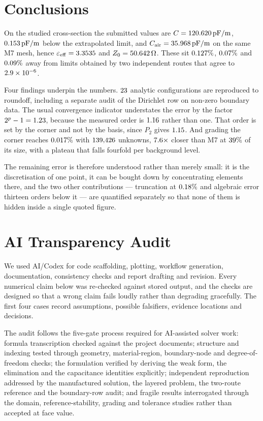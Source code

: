 \documentclass[11pt]{article}
\newcommand{\epseff}{\varepsilon_{\mathrm{eff}}}
\newcommand{\Cair}{C_{\mathrm{air}}}   %
\newcommand{\Zzero}{Z_0}
\begin{document}
\section{Conclusions}
\begin{sloppypar}
On the studied cross-section the submitted values are
$C=120.620\,\mathrm{pF/m}$, $0.153\,\mathrm{pF/m}$ below the extrapolated limit, and
$\Cair=\CAir\,\mathrm{pF/m}$ on the same M7 mesh, hence $\epseff=\EpsEff$ and $\Zzero=\ZFinal\,\Omega$. These sit
$0.127\%$, $0.07\%$ and $0.09\%$ away from limits obtained by two independent
routes that agree to $2.9\times10^{-6}$.
\end{sloppypar}

Four findings underpin the numbers. $23$ analytic configurations are reproduced to
roundoff, including a separate audit of the Dirichlet row on non-zero boundary data. The usual
convergence indicator understates the error by the factor $2^{p}-1=1.23$, because the
measured order is $1.16$ rather than one. That order is set by the corner and not by the
basis, since $P_2$ gives $1.15$. And grading the corner reaches $0.017\%$ with
$139{,}426$ unknowns, $7.6\times$ closer than M7 at $39\%$ of its size,
with a plateau that falls fourfold per background level.

The remaining error is therefore understood rather than merely small: it is the
discretisation of one point, it can be bought down by concentrating elements there, and the
two other contributions --- truncation at $0.18\%$ and algebraic error thirteen
orders below it --- are quantified separately so that none of them is hidden inside a single
quoted figure.




\appendix
\section{AI Transparency Audit}
We used AI/Codex for code scaffolding, plotting, workflow generation, documentation,
consistency checks and report drafting and revision. Every numerical claim below was
re-checked against stored output, and the checks are designed so that a wrong claim fails
loudly rather than degrading gracefully. The first four cases record assumptions, possible
falsifiers, evidence locations and decisions.

The audit follows the five-gate process required for AI-assisted solver work: formula
transcription checked against the project documents; structure and indexing tested through
geometry, material-region, boundary-node and degree-of-freedom checks; the formulation
verified by deriving the weak form, the elimination and the capacitance identities
explicitly; independent reproduction addressed by the manufactured solution, the layered
problem, the two-route reference and the boundary-row audit; and fragile results
interrogated through the domain, reference-stability, grading and tolerance studies rather
than accepted at face value.
\end{document}
